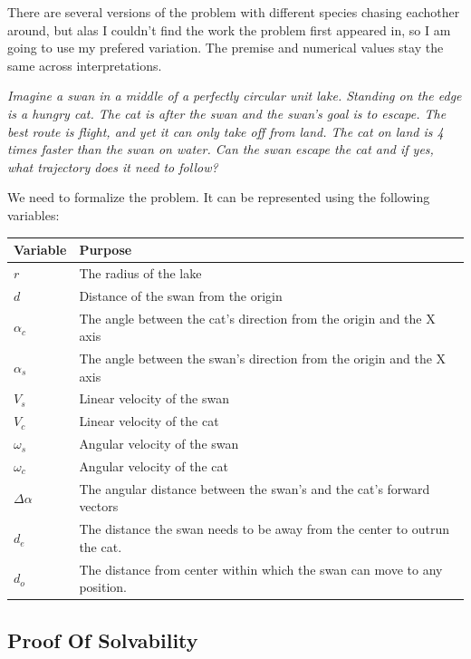 \documentclass[12pt]{article}
\begin{document}
There are several versions of the problem with different species chasing eachother around, but alas I couldn't find the work the problem first appeared in, so I am going to use my prefered variation. The premise and numerical values stay the same across interpretations.

\emph{Imagine a swan in a middle of a perfectly circular unit lake. Standing on the edge is a hungry cat. The cat is after the swan and the swan's goal is to escape. The best route is flight, and yet it can only take off from land. The cat on land is 4 times faster than the swan on water. Can the swan escape the cat and if yes, what trajectory does it need to follow?}

We need to formalize the problem. It can be represented using the following variables:

\begin{tabular}{|l|l|}
\hline
\textbf{Variable} & \textbf{Purpose}\\
\hline
$r$ & The radius of the lake\\
$d$ & Distance of the swan from the origin\\
$\alpha_c$ & The angle between the cat's direction from the origin and the X axis\\
$\alpha_s$ & The angle between the swan's direction from the origin and the X axis\\
$V_s$ & Linear velocity of the swan\\
$V_c$ & Linear velocity of the cat\\
$\omega_s$ & Angular velocity of the swan\\
$\omega_c$ & Angular velocity of the cat\\
$\Delta \alpha$ & The angular distance between the swan's and the cat's forward vectors\\
$d_e$ & The distance the swan needs to be away from the center to outrun the cat.\\
$d_o$ & The distance from center within which the swan can move to any position.\\

\hline
\end{tabular}
\vspace{12pt}
\begin{center}
\end{center}

\subsection{Proof Of Solvability}
\end{document}
